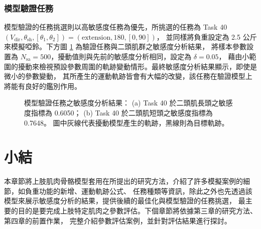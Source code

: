 \subsubsection{模型驗證任務}
模型驗證的任務挑選則以高敏感度任務為優先，所挑選的任務為 Task 40 $(V_\mathrm{dir},\theta_\mathrm{sh},[\theta_1,\theta_2]) = (\text{extension},180,[0,90])$，
並同樣將負重設定為 2.5 公斤來模擬啞鈴。下方圖 \ref{ch4_fig_SAResults_Vali} 為驗證任務與二頭肌群之敏感度分析結果，
將樣本參數設置為 $N_\mathrm{sa} = 500$，擾動值則與先前的敏感度分析相同，設定為 $\delta = 0.05$，
藉由小範圍的擾動來檢視預設參數周圍的軌跡變動情形。最終敏感度分析結果顯示，即使是微小的參數變動，
其所產生的運動軌跡皆會有大幅的改變，該任務在驗證模型上將能有良好的鑑別作用。

\begin{figure}[!ht]
	\centering
    \caption[模型驗證任務之敏感度分析結果]{模型驗證任務之敏感度分析結果：
                                         (a) Task 40 於二頭肌長頭之敏感度指標為 0.6050；
                                         (b) Task 40 於二頭肌短頭之敏感度指標為 0.7648。
                                         圖中灰線代表擾動模型產生的軌跡，黑線則為目標軌跡。}
    \label{ch4_fig_SAResults_Vali}
\end{figure}

\section{小結}
本章節將上肢肌肉骨骼模型套用在所提出的研究方法，介紹了許多模擬案例的細節，如負重功能的新增、運動軌跡公式、
任務種類等資訊，除此之外也先透過該模型來展示敏感度分析的結果，提供後續的最佳化與模型驗證的任務挑選，
最主要的目的是要完成上肢特定肌肉之參數評估。下個章節將依據第三章的研究方法、第四章的前置作業，
完整介紹參數評估案例，並針對評估結果進行探討。

\clearpage